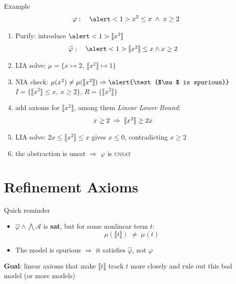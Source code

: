 \documentclass[11pt]{beamer}
\newcommand{\pure}[1]{\llbracket{#1}\rrbracket}
\begin{document}
\begin{frame}{Example}
	\[
		\varphi:\quad \alert<1>{x^2}\leq x \;\land\; x\geq 2
	\]
	\begin{enumerate}
		\small
		\item<1-> Purify: introduce $\alert<1>{\pure{x^2}}$
		      \[
			      \hspace*{-\leftmargin}\makebox[\textwidth][c]{$\widehat\varphi:\quad
					      \alert<1>{\pure{x^2}}\leq x\land x\geq 2$}
		      \]
		\item<2-> LIA solve: $\mu=\{x\mapsto 2,\ \pure{x^2}\mapsto 1\}$
		\item<3-> NIA check: $\mu(x^2) \neq \mu(\pure{x^2}) \Rightarrow \alert{\text{$\mu$ is spurious}}$\\
		      $I=\{\pure{x^2}\leq x,\ x\geq 2\}$, $R=\{\pure{x^2}\}$
		\item<4-> add axioms for $\pure{x^2}$, among them \textit{Linear Lower Bound}:
		      \[
			      \hspace*{-\leftmargin}\makebox[\textwidth][c]{$x\geq 2 \;\Rightarrow\; \pure{x^2}\geq 2x$}
		      \]
		\item<5-> LIA solve: $2x\leq \pure{x^2}\leq x$ gives $x\leq 0$, contradicting
		      $x\geq 2$
		\item<6-> the abstraction is unsat $\Rightarrow$ $\varphi$ is
		      \alert{\textsc{unsat}}
	\end{enumerate}
\end{frame}

\section{Refinement Axioms}

\begin{frame}{Quick reminder}
	\begin{itemize}
		\item $\widehat\varphi\land\bigwedge\mathcal{A}$ is \textbf{sat}, but for
		      some nonlinear term $t$:
		      \[
			      \mu(\pure{t})\;\neq\;\mu(t)
		      \]
		\item The model is \alert{spurious} $\Rightarrow$ it satisfies $\widehat\varphi$,
		      not $\varphi$
		      \vskip 1cm
	\end{itemize}
	\textbf{Goal}: linear axioms that make $\pure{t}$ track $t$ more closely and \alert{rule out}
	this bad model (or more models)
\end{frame}
\end{document}
